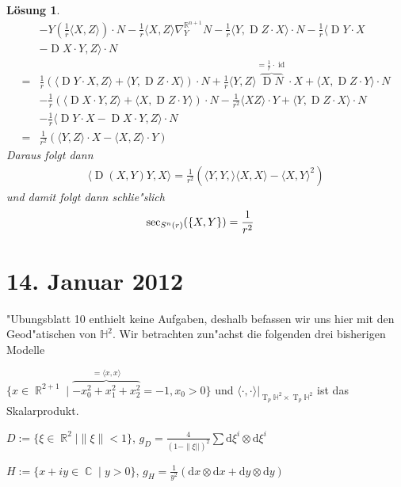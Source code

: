 \documentclass[paper=A4, twoside, chapterprefix=true, bibliography=totoc, headsepline]{scrbook}
\DeclareMathOperator{\C}{\mathbb{C}}
\DeclareMathOperator{\R}{\mathbb{R}}
\renewcommand{\H}{\ensuremath{\mathbb{H}}}
\DeclareMathOperator{\id}{id} %
\DeclareMathOperator{\D}{D} %
\DeclareMathOperator{\T}{T} %
\newcommand{\dop}{\mathrm{d}}
\newcommand{\X}{\times}
\theoremstyle{plain}
\theoremstyle{nonumberplain}
\theoremstyle{empty}
\theoremstyle{break}
\newtheorem{Loes}{L\"osung}
\begin{document}
\begin{Loes}
\begin{align*}
		& - Y ( \frac{1}{r} \langle X, Z \rangle ) \cdot N - \frac{1}{r} \langle X, Z \rangle \nabla_Y^{\R^{n+1}} N - \frac{1}{r} \langle Y, \D Z \cdot X \rangle \cdot N - \frac{1}{r} \langle \D Y \cdot X\\
		& - \D X \cdot Y, Z \rangle \cdot N\\
	={}& \frac{1}{r} ( \langle \D Y \cdot X, Z \rangle + \langle Y, \D Z \cdot X \rangle ) \cdot N + \frac{1}{r} \langle Y, Z \rangle \overbrace{\D N}^{= \frac{1}{r} \cdot \id} \cdot X + \langle X, \D Z \cdot Y \rangle \cdot N\\
		& - \frac{1}{r} ( \langle \D X \cdot Y, Z \rangle + \langle X, \D Z \cdot Y \rangle ) \cdot N - \frac{1}{r^2} \langle X Z \rangle \cdot Y + \langle Y, \D Z \cdot X \rangle \cdot N\\
		& - \frac{1}{r} \langle \D Y \cdot X - \D X \cdot Y, Z \rangle \cdot N\\
	={}& \frac{1}{r^2} ( \langle Y, Z \rangle \cdot X - \langle X, Z \rangle \cdot Y)
\end{align*}
Daraus folgt dann
\begin{align*}
	\langle \D(X,Y) Y, X \rangle = \frac{1}{r^2} ( \langle Y, Y, \rangle \langle X, X \rangle - \langle X, Y \rangle^2)
\end{align*}
und damit folgt dann schlie"slich
\begin{align*}
\sec_{S^n(r)}(\span\{X,Y\}) = \frac{1}{r^2}
\end{align*}
\end{Loes}


\section{14. Januar 2012}
\setcounter{Aufg}{0} %
\setcounter{Loes}{0}

"Ubungsblatt 10 enthielt keine Aufgaben, deshalb befassen wir uns hier mit den Geod"atischen von $\H^2$.
Wir betrachten zun"achst die folgenden drei bisherigen Modelle \begin{description}[leftmargin=*]
\item[Hyperboloid:]
	$\{ x \in \R^{2+1} \mid \overbrace{-x_0^2 + x_1^2 + x_2^2}^{= \langle x,x \rangle} = -1, x_0 > 0 \}$ und $\langle \cdot, \cdot \rangle|_{\T_p\H^2 \X \T_p\H^2}$ ist das Skalarprodukt.
\item[Poincare Kreisscheibenmodell:]
	$D := \{ \xi \in \R^2 \mid \|\xi\| < 1 \}$, $g_D = \frac{4}{(1 - \|\xi||)^2} \sum \dop \xi^{i} \otimes \dop \xi^{i}$
\item[Poincare obere Halbebene Modell:]
	$H := \{ x + iy \in \C \mid y > 0 \}$, $g_H = \frac{1}{y^2}(\dop x \otimes \dop x + \dop y \otimes \dop y)$
\end{description}
\end{document}
